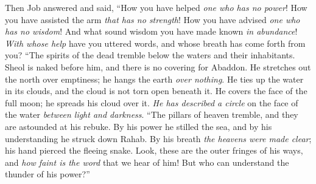 \begin{biblechapter} %
 Then Job answered and said,
\verse “How you have helped \textit{one who has no power}! 
How you have assisted the arm \textit{that has no strength}!
\verse How you have advised \textit{one who has no wisdom}! 
And what sound wisdom you have made known \textit{in abundance}!
\verse \textit{With whose help} have you uttered words, 
and whose breath has come forth from you?
\verse “The spirits of the dead tremble 
below the waters and their inhabitants.
\verse Sheol is naked before him, 
and there is no covering for Abaddon.
\verse He stretches out the north over emptiness; 
he hangs the earth \textit{over nothing}.
\verse He ties up the water in its clouds, 
and the cloud is not torn open beneath it.
\verse He covers the face of the full moon; 
he spreads his cloud over it.
\verse \textit{He has described a circle} on the face of the water 
\textit{between light and darkness}.
\verse “The pillars of heaven tremble, 
and they are astounded at his rebuke.
\verse By his power he stilled the sea, 
and by his understanding he struck down Rahab.
\verse By his breath \textit{the heavens were made clear}; 
his hand pierced the fleeing snake.
\verse Look, these are the outer fringes of his ways, 
and \textit{how faint is the word} that we hear of him! 
But who can understand the thunder of his power?”
\end{biblechapter}


